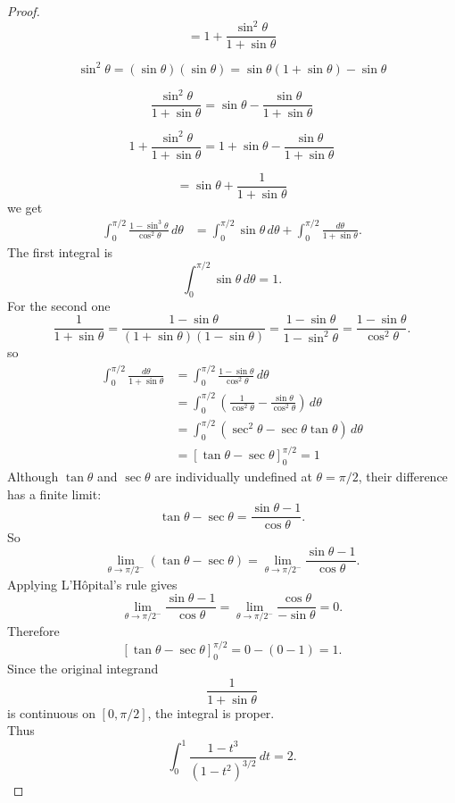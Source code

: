 \documentclass[11pt,a4paper]{report}
\begin{document}
\begin{proof}
		\[
		= 1 + \frac{\sin^2\theta}{1+\sin\theta}
		\]
		
		\[
		\sin^2\theta = (\sin\theta)(\sin\theta)
		= \sin\theta(1+\sin\theta) - \sin\theta
		\]
		
		\[
		\frac{\sin^2\theta}{1+\sin\theta}
		= \sin\theta - \frac{\sin\theta}{1+\sin\theta}
		\]
		
		\[
		1 + \frac{\sin^2\theta}{1+\sin\theta}
		= 1 + \sin\theta - \frac{\sin\theta}{1+\sin\theta}
		\]
		
		\[
		= \sin\theta + \frac{1}{1+\sin\theta}
		\]
		we get
		\begin{align}
			\int_0^{\pi/2}
			\frac{1-\sin^3\theta}{\cos^2\theta}\,d\theta
			&=
			\int_0^{\pi/2}\sin\theta\,d\theta
			+
			\int_0^{\pi/2}\frac{d\theta}{1+\sin\theta}.
		\end{align}
		The first integral is
		\[
		\int_0^{\pi/2}\sin\theta\,d\theta=1.
		\]
		For the second one
		\[
		\frac{1}{1+\sin\theta}
		= \frac{1-\sin\theta}{(1+\sin\theta)(1-\sin\theta)}
		= \frac{1-\sin\theta}{1-\sin^2\theta}
		= \frac{1-\sin\theta}{\cos^2\theta}.
		\]
		so
		\begin{align}
			\int_0^{\pi/2}\frac{d\theta}{1+\sin\theta}
			&= \int_0^{\pi/2}\frac{1-\sin\theta}{\cos^2\theta}\,d\theta \\
			&= \int_0^{\pi/2}\left(\frac{1}{\cos^2\theta}-\frac{\sin\theta}{\cos^2\theta}\right)\,d\theta \\
			&= \int_0^{\pi/2}\left(\sec^2\theta-\sec\theta\tan\theta\right)\,d\theta \\
			&= \left[\tan\theta-\sec\theta\right]_0^{\pi/2} = 1
		\end{align}
		Although $\tan\theta$ and $\sec\theta$ are individually undefined at
		$\theta=\pi/2$, their difference has a finite limit:
		\[
		\tan\theta-\sec\theta
		=
		\frac{\sin\theta-1}{\cos\theta}.
		\]
		So
		\[
		\lim_{\theta\to\pi/2^-}\left(\tan\theta-\sec\theta\right)
		=
		\lim_{\theta\to\pi/2^-}\frac{\sin\theta-1}{\cos\theta}.
		\]
		Applying L'Hôpital's rule gives
		\[
		\lim_{\theta\to\pi/2^-}\frac{\sin\theta-1}{\cos\theta}
		=
		\lim_{\theta\to\pi/2^-}\frac{\cos\theta}{-\sin\theta}
		=0.
		\]
		Therefore
		\[
		\left[\tan\theta-\sec\theta\right]_0^{\pi/2}
		=
		0-(0-1)=1.
		\]
		Since the original integrand
		\[
		\frac{1}{1+\sin\theta}
		\]
		is continuous on $[0,\pi/2]$, the integral is proper.\\
		Thus
		\begin{equation}
			\int_0^1
			\frac{1-t^3}{(1-t^2)^{3/2}}\,dt
			=
			2.
			\label{eq:I1_value_explicit}
		\end{equation}	

\end{proof}
\end{document}
